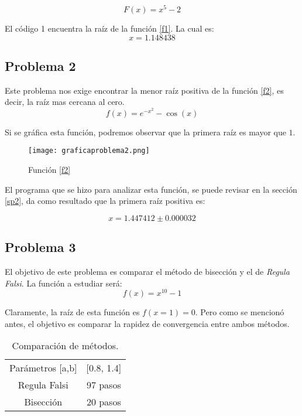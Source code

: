 \documentclass[12pt]{article}
\begin{document}
\begin{equation}
\label{f1}
    F(x) = x^5 -2
\end{equation}

El código 1 encuentra la raíz de la función \ref{f1}. La cual es:
\begin{equation*}
    x=1.148438
\end{equation*}

\subsection{Problema 2}
Este problema nos exige encontrar la menor raíz positiva de la función \ref{f2}, es decir, la raíz mas cercana al cero.
\begin{equation}
    \label{f2}
    f(x)=e^{-x^2} - \cos(x) 
\end{equation}

Si se gráfica esta función, podremos observar que la primera raíz es mayor que $1$. 

\begin{figure}[h]
    \centering
    \texttt{[image: graficaproblema2.png]}
    \caption{Función \ref{f2}}
    \label{fig:f2}
\end{figure}

El programa que se hizo para analizar esta función, se puede revisar en la sección \ref{sp2}, da como resultado que la primera raíz positiva es:

\begin{equation*}
    x= 1.447412 \pm 0.000032 
\end{equation*}
\newpage
\subsection{Problema 3}

El objetivo de este problema es comparar el método de bisección y el de \textit{Regula Falsi}. La función a estudiar será:
\begin{equation}
\label{f3}
    f(x) = x^{10} -1
\end{equation}

Claramente, la raíz de esta función es $f(x=1)=0$. Pero como se mencionó antes, el objetivo es comparar la rapidez de convergencia entre ambos métodos. 

\begin{table}[h]
    \centering
    \begin{tabular}{cc}
        Parámetros [a,b] & [0.8, 1.4] \\
         Regula Falsi & 97 pasos \\
         Bisección& 20 pasos\\
    \end{tabular}
    \caption{Comparación de métodos.}
    \label{tab:rp3}
\end{table}
\end{document}
